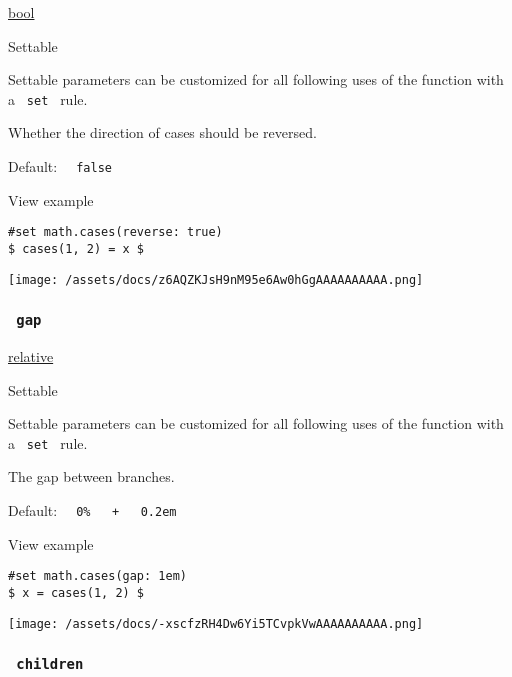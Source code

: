\href{/docs/reference/foundations/bool/}{bool}

{{ Settable }}

\label{parameters-reverse-settable-tooltip}
Settable parameters can be customized for all following uses of the
function with a \texttt{\ set\ } rule.

Whether the direction of cases should be reversed.

Default: \texttt{\ }{\texttt{\ false\ }}\texttt{\ }


View example

\begin{verbatim}
#set math.cases(reverse: true)
$ cases(1, 2) = x $
\end{verbatim}

\texttt{[image: /assets/docs/z6AQZKJsH9nM95e6Aw0hGgAAAAAAAAAA.png]}

\subsubsection{\texorpdfstring{\texttt{\ gap\ }}{ gap }}\label{parameters-gap}

\href{/docs/reference/layout/relative/}{relative}

{{ Settable }}

\label{parameters-gap-settable-tooltip}
Settable parameters can be customized for all following uses of the
function with a \texttt{\ set\ } rule.

The gap between branches.

Default:
\texttt{\ }{\texttt{\ 0\%\ }}\texttt{\ }{\texttt{\ +\ }}\texttt{\ }{\texttt{\ 0.2em\ }}\texttt{\ }


View example

\begin{verbatim}
#set math.cases(gap: 1em)
$ x = cases(1, 2) $
\end{verbatim}

\texttt{[image: /assets/docs/-xscfzRH4Dw6Yi5TCvpkVwAAAAAAAAAA.png]}

\subsubsection{\texorpdfstring{\texttt{\ children\ }}{ children }}\label{parameters-children}

